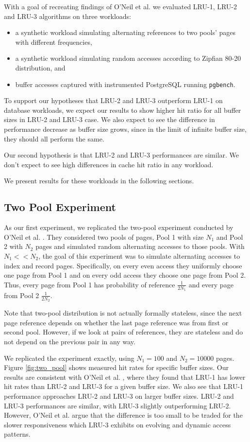 With a goal of recreating findings of O'Neil et al. \cite{lruk} we evaluated LRU-1, LRU-2 and LRU-3 algorithms on three workloads:
\begin{itemize}
\item a synthetic workload simulating alternating references to two pools' pages with different frequencies,
\item a synthetic workload simulating random accesses according to Zipfian 80-20 distribution, and
\item buffer accesses captured with instrumented PostgreSQL running \texttt{pgbench}.
\end{itemize}

To support our hypotheses that LRU-2 and LRU-3 outperform LRU-1 on database workloads, we expect our results to show higher hit ratio for all buffer sizes in LRU-2 and LRU-3 case. We also expect to see the difference in performance decrease as buffer size grows, since in the limit of infinite buffer size, they should all perform the same.

Our second hypothesis is that LRU-2 and LRU-3 performances are similar. We don't expect to see high differences in cache hit ratio in any workload.

We present results for these workloads in the following sections.

\subsection{Two Pool Experiment}

As our first experiment, we replicated the two-pool experiment conducted by O'Neil et al. \cite{lruk}. They considered two pools of pages, Pool 1 with size $N_1$ and Pool 2 with $N_2$ pages and simulated random alternating accesses to those pools. With $N_1 << N_2$, the goal of this experiment was to simulate alternating accesses to index and record pages. Specifically, on every even access they uniformly choose one page from Pool 1 and on every odd access they choose one page from Pool 2. Thus, every page from Pool 1 has probability of reference $\frac{1}{2N_1}$ and every page from Pool 2 $\frac{1}{2N_2}$.

Note that two-pool distribution is not actually formally stateless, since the next page reference depends on whether the last page reference was from first or second pool. However, if we look at pairs of references, they are stateless and do not depend on the previous pair in any way.

We replicated the experiment exactly, using $N_1 = 100$ and $N_2 = 10000$ pages. Figure \ref{fig:two_pool} shows measured hit rates for specific buffer sizes. Our results are consistent with O'Neil et al. \cite{lruk}, where they found that LRU-1 has lower hit rates than LRU-2 and LRU-3 for a given buffer size. We also see that LRU-1 performance approaches LRU-2 and LRU-3 on larger buffer sizes. LRU-2 and LRU-3 performances are similar, with LRU-3 slightly outperforming LRU-2. However, O'Neil et al. argue that the difference is too small to be traded for the slower responsiveness which LRU-3 exhibits on evolving and dynamic access patterns.

